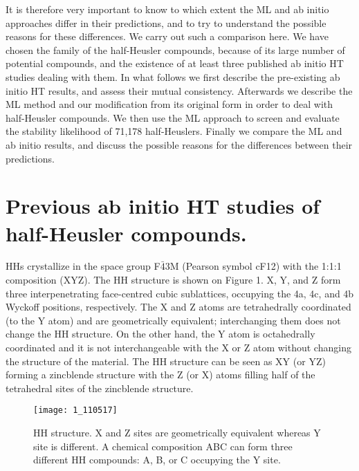 \documentclass[pt10,journal=jacsat,manuscript=article,layout=twocolumn]{achemso}
\begin{document}
It is therefore very important to know to which extent the ML and ab initio approaches differ in their predictions, and to try to understand the possible reasons for these differences. We carry out such a comparison here. We have chosen the family of the half-Heusler compounds, because of its large number of potential compounds, and the existence of at least three published ab initio HT studies dealing with them\cite{FindingUnprecedentedly,SortingStable,Computationalinvestigation}. In what follows we first describe the pre-existing ab initio HT results, and assess their mutual consistency. Afterwards we describe the ML method and our modification from its original form in order to deal with half-Heusler compounds. We then use the ML approach to screen and evaluate the stability likelihood of 71,178 half-Heuslers. Finally we compare the ML and ab initio results, and discuss the possible reasons for the differences between their predictions.

\section{Previous ab initio HT studies of half-Heusler compounds.}

HHs crystallize in the space group F$\bar{4}3$M (Pearson symbol cF12) with the 1:1:1 composition (XYZ). The HH structure is shown on Figure 1. X, Y, and Z form three interpenetrating face-centred cubic sublattices, occupying the 4a, 4c, and 4b Wyckoff positions, respectively. The X and Z atoms are tetrahedrally coordinated (to the Y atom) and are geometrically equivalent; interchanging them does not change the HH structure. On the other hand, the Y atom is octahedrally coordinated and it is not interchangeable with the X or Z atom without changing the structure of the material. The HH structure can be seen as XY (or YZ) forming a zincblende structure with the Z (or X) atoms filling half of the tetrahedral sites of the zincblende structure.


\begin{figure}
\texttt{[image: 1\_110517]}

\caption{HH structure. X and Z sites are geometrically equivalent whereas Y site is different. A chemical composition ABC can form three different HH compounds: A, B, or C occupying the Y site.}

\end{figure}
\end{document}
